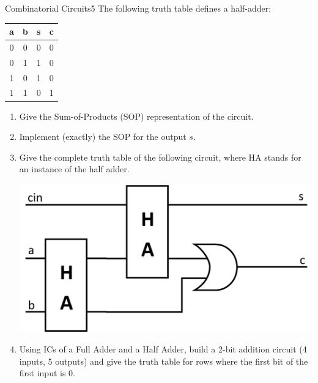 \documentclass[twoside]{article}
\begin{document}
\begin{task}{Combinatorial Circuits}{5}{}
  The following truth table defines a half-adder:

  \begin{tabular}{cc|cc}
    a & b & s & c \\ \hline
    0 & 0 & 0 & 0 \\
    0 & 1 & 1 & 0 \\
    1 & 0 & 1 & 0 \\
    1 & 1 & 0 & 1 \\
    \end{tabular}

  
  \begin{enumerate}
  \item {Give the Sum-of-Products (SOP) representation of the circuit. \vspace*{3cm}}
  \item{Implement (exactly) the SOP for the output $s$.

    
    \vspace*{6cm}}
  \item{Give the complete truth table of the following circuit, where HA stands for an instance of the half adder.

    \includegraphics[width=.5\textwidth]{gfx/halfadder.png}
}
    \clearpage
    \item{Using ICs of a Full Adder and a Half Adder, build a 2-bit addition circuit (4 inputs, 5 outputs) and give the truth table for rows where the first bit of the first input is 0.}
  \end{enumerate}
  
\end{task}
\clearpage
\end{document}
